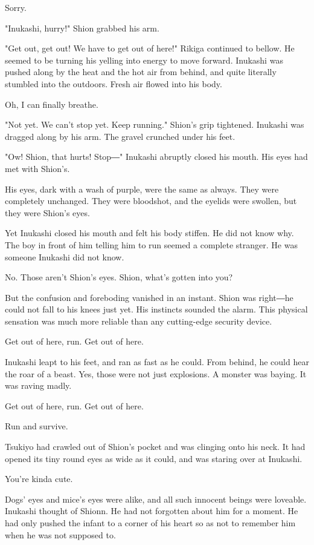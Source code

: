 Sorry.

"Inukashi, hurry!" Shion grabbed his arm.

"Get out, get out! We have to get out of here!" Rikiga continued to
bellow. He seemed to be turning his yelling into energy to move forward.
Inukashi was pushed along by the heat and the hot air from behind, and
quite literally stumbled into the outdoors. Fresh air flowed into his
body.

Oh, I can finally breathe.

"Not yet. We can't stop yet. Keep running." Shion's grip tightened.
Inukashi was dragged along by his arm. The gravel crunched under his
feet.

"Ow! Shion, that hurts! Stop―" Inukashi abruptly closed his mouth. His
eyes had met with Shion's.

His eyes, dark with a wash of purple, were the same as always. They were
completely unchanged. They were bloodshot, and the eyelids were swollen,
but they were Shion's eyes.

Yet Inukashi closed his mouth and felt his body stiffen. He did not know
why. The boy in front of him telling him to run seemed a complete
stranger. He was someone Inukashi did not know.

No. Those aren't Shion's eyes. Shion, what's gotten into you?

But the confusion and foreboding vanished in an instant. Shion was
right―he could not fall to his knees just yet. His instincts sounded the
alarm. This physical sensation was much more reliable than any
cutting-edge security device.

Get out of here, run. Get out of here.

Inukashi leapt to his feet, and ran as fast as he could. From behind, he
could hear the roar of a beast. Yes, those were not just explosions. A
monster was baying. It was raving madly.

Get out of here, run. Get out of here.

Run and survive.

Tsukiyo had crawled out of Shion's pocket and was clinging onto his
neck. It had opened its tiny round eyes as wide as it could, and was
staring over at Inukashi.

You're kinda cute.

Dogs' eyes and mice's eyes were alike, and all such innocent beings were
loveable. Inukashi thought of Shionn. He had not forgotten about him for
a moment. He had only pushed the infant to a corner of his heart so as
not to remember him when he was not supposed to.


